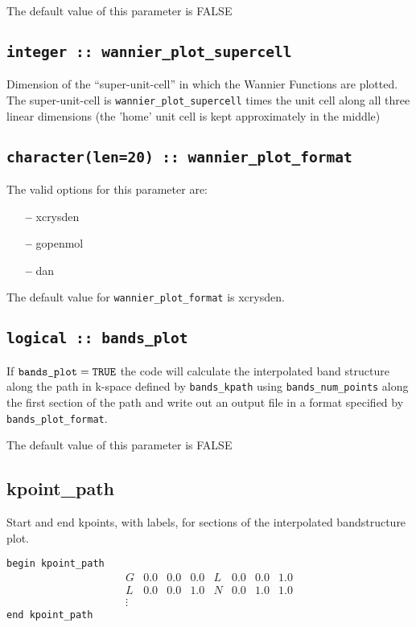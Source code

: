 The default value of this parameter is FALSE

\subsection[wannier\_plot\_supercell]{\tt integer :: wannier\_plot\_supercell}

Dimension of the ``super-unit-cell'' in which the Wannier Functions are plotted.
     The super-unit-cell is \verb#wannier_plot_supercell# times the unit cell along all three
     linear dimensions (the 'home' unit cell is kept approximately
     in the middle)


\subsection[wannier\_plot\_format]{\tt character(len=20) :: wannier\_plot\_format}

The valid options for this parameter are:
\begin{itemize}
\item[{\bf --}] xcrysden
\item[{\bf --}] gopenmol
\item[{\bf --}] dan
\end{itemize}

The default value for \verb#wannier_plot_format# is xcrysden.



\subsection[bands\_plot]{\tt logical :: bands\_plot}

If $\verb#bands_plot#=\verb#TRUE#$ the code will calculate the interpolated band structure along
the path in k-space defined by \verb#bands_kpath# using \verb#bands_num_points# along the first
section of the path and write out an output file in a format specified
by \verb#bands_plot_format#. 

The default value of this parameter is FALSE


\subsection[kpoint\_path]{kpoint\_path}
Start and end kpoints, with labels, for sections of the interpolated
bandstructure plot.

\noindent  \verb#begin kpoint_path#
$$
\begin{array}{cccccccc}
G & 0.0 & 0.0 & 0.0 & L & 0.0 & 0.0 & 1.0 \\
L & 0.0 & 0.0 & 1.0 & N & 0.0 & 1.0 & 1.0 \\
\vdots
\end{array}
$$
\verb#end kpoint_path#

